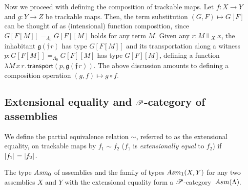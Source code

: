 \documentclass[a4paper,UKenglish,numberwithinsect,cleveref,thm-restate,draft]{lipics-v2021}
\numberwithin{equation}{section}
\theoremstyle{definition}
\theoremstyle{plain}
\begin{document}
Now we proceed with defining the composition of trackable maps. Let $f\colon X \to Y$ and $g\colon Y \to Z$ be trackable maps.
Then, the term substitution $(G, F) \mapsto G [ F ]$ can be thought of as (intensional) function composition, since $G[F[M]] =_{\Lambda_0} G[F] [M]$ holds for any term $M$.
Given any $r : M \Vdash_X x$, the inhabitant $\mathfrak{g}(\mathfrak{f}\,r)$ has type $G[F[M]]$ and its transportation along a witness $p : G[F[M]] =_{\Lambda_0} G[F][M]$ has type $G[F][M]$, defining a function $\lambda M\,x\,r.\, \mathsf{transport}(p, \mathfrak{g}(\mathfrak{f}\,r))$.
The above discussion amounts to defining a composition operation $(g, f) \mapsto g \circ f$.




\subsection{Extensional equality and \texorpdfstring{$\mathscr{P}$}{P}-category of assemblies}

We define the partial equivalence relation $\sim$, referred to as the extensional equality, on trackable maps by $f_1 \sim f_2$ ($f_1$ is \emph{extensionally equal} to $f_2$) if $\mathopen{}\left|f_1\right|_{}^{}\mathclose{} = \mathopen{}\left|f_2\right|_{}^{}\mathclose{}$.
\begin{proposition}
  The type $\Asm_0$ of assemblies and the family of types $\Asm_1(X, Y)$ for any two assemblies $X$ and $Y$ with the extensional equality form a $\mathscr{P}$-category~$\Asm(\Lambda)$.
\end{proposition}
\end{document}
